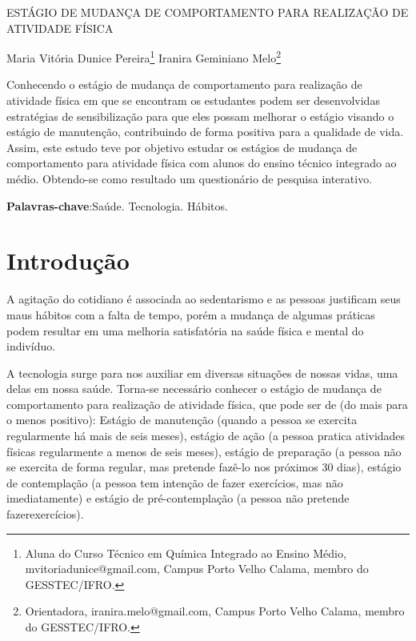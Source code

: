 \documentclass[article,12pt,onesidea,4paper,english,brazil]{abntex2}
\begin{document}
	
	
	\frenchspacing 
	
	\begin{center}
		\LARGE ESTÁGIO DE MUDANÇA DE COMPORTAMENTO PARA REALIZAÇÃO DE ATIVIDADE FÍSICA
		
		\normalsize
		 Maria Vitória Dunice Pereira\footnote{Aluna do Curso Técnico em Química Integrado ao Ensino Médio, mvitoriadunice@gmail.com,
			Campus Porto Velho Calama, membro do GESSTEC/IFRO.
		} 
		Iranira Geminiano Melo\footnote{Orientadora, iranira.melo@gmail.com, Campus Porto Velho Calama, membro do GESSTEC/IFRO.} 
		
	\end{center}
	
	\begin{resumoumacoluna}
	Conhecendo o estágio de mudança de comportamento para realização de atividade física em que se encontram os estudantes podem ser desenvolvidas estratégias de sensibilização para que eles possam melhorar o estágio visando o estágio de manutenção, contribuindo de forma positiva para a qualidade de vida. Assim, este estudo teve por objetivo estudar os estágios de mudança de comportamento para atividade física com alunos do ensino técnico integrado ao médio. Obtendo-se como resultado um questionário de pesquisa interativo.
		
		\vspace{\onelineskip}
		
		\noindent
		\textbf{Palavras-chave}:Saúde. Tecnologia. Hábitos.
	\end{resumoumacoluna}
	
	\section*{Introdução}
	
	A agitação do cotidiano é associada ao sedentarismo e as pessoas justificam seus maus hábitos com a falta de tempo, porém a mudança de algumas práticas podem resultar em uma melhoria satisfatória na saúde física e mental do indivíduo.
	
	A tecnologia surge para nos auxiliar em diversas situações de nossas vidas, uma delas em nossa saúde. Torna-se necessário conhecer o estágio de mudança  de comportamento para realização de atividade física, que pode ser de (do mais para o menos positivo): Estágio de manutenção (quando a pessoa se exercita regularmente há mais de seis meses), estágio de ação (a pessoa pratica atividades físicas regularmente a menos de seis meses), estágio de preparação (a pessoa não se exercita de forma regular, mas pretende fazê-lo nos próximos 30 dias), estágio de contemplação (a pessoa tem intenção de fazer exercícios, mas não imediatamente) e estágio de pré-contemplação (a pessoa não pretende fazerexercícios).
	
\end{document}
